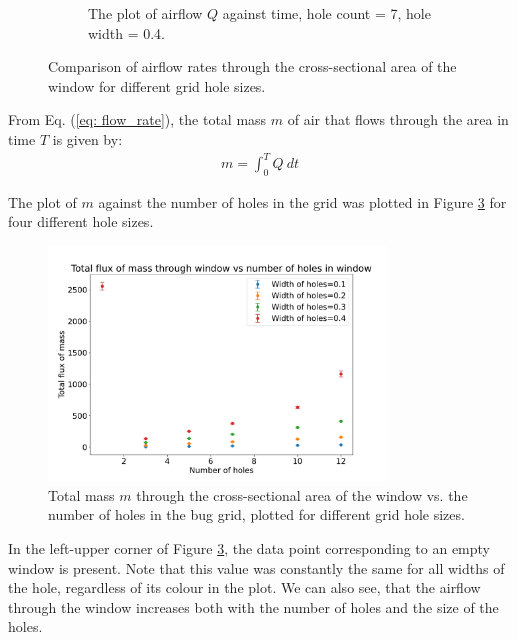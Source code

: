 \begin{figure}[H]
\begin{subfigure}[b]{0.47\textwidth}
        \caption{The plot of airflow $Q$ against time, hole count = 7, hole width = 0.4.}
        \label{fig: flowrate3}
    \end{subfigure}
    \caption{Comparison of airflow rates through the cross-sectional area of the window for different grid hole sizes.}
    \label{fig: bound_plos_flowrate3}
\end{figure}



From Eq. (\ref{eq: flow_rate}), the total mass $m$ of air that flows through the area in time $T$ is given by:
\begin{gather}
    m = \int_0^T Q ~dt
\end{gather}

 The plot of $m$ against the number of holes in the grid was plotted in Figure \ref{fig: flow_rate} for four different hole sizes.
\begin{figure}[H]
    \centering
    \includegraphics[width=0.8\textwidth]{figures/flux_vs_holes.pdf}
    \caption{Total mass $m$ through the cross-sectional area of the window vs. the number of holes in the bug grid, plotted for different grid hole sizes.}
    \label{fig: flow_rate}
\end{figure}
In the left-upper corner of Figure \ref{fig: flow_rate}, the data point corresponding to an empty window is present. Note that this value was constantly the same for all widths of the hole, regardless of its colour in the plot. We can also see, that the airflow through the window increases both with the number of holes and the size of the holes. \\

